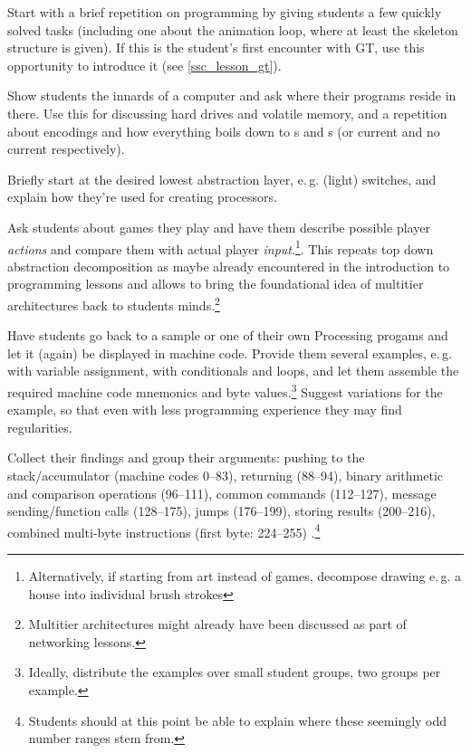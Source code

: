 \begin{instructions}
\item Start with a brief repetition on programming by giving students a few quickly solved tasks (including one about the animation loop, where at least the skeleton structure is given). If this is the student's first encounter with \ac{GT}, use this opportunity to introduce it (see \ref{ssc_lesson_gt}).
\item Show students the innards of a computer and ask where their programs reside in there. Use this for discussing hard drives and volatile memory, and a repetition about encodings and how everything boils down to s and s (or current and no current respectively).
\item Briefly start at the desired lowest abstraction layer, e.\,g. (light) switches, and explain how they're used for creating processors.
\item Ask students about games they play and have them describe possible player \emph{actions} and compare them with actual player \emph{input}.\footnote{Alternatively, if starting from art instead of games, decompose drawing e.\,g. a house into individual brush strokes}. This repeats top down abstraction decomposition as maybe already encountered in the introduction to programming lessons and allows to bring the foundational idea of multitier architectures back to students minds.\footnote{Multitier architectures might already have been discussed as part of networking lessons.}
\item Have students go back to a sample or one of their own Processing progams and let it (again) be displayed in machine code. Provide them several examples, e.\,g. with variable assignment, with conditionals and loops, and let them assemble the required machine code mnemonics and byte values.\footnote{Ideally, distribute the examples over small student groups, two groups per example.} Suggest variations for the example, so that even with less programming experience they may find regularities.
\item Collect their findings and group their arguments: pushing to the stack/accumulator (machine codes 0--83), returning (88--94), binary arithmetic and comparison operations (96--111), common commands (112--127), message sending/function calls (128--175), jumps (176--199), storing results (200--216), combined multi-byte instructions (first byte: 224--255) \cite[p.\,12]{Ber14}.\footnote{Students should at this point be able to explain where these seemingly odd number ranges stem from.}

\end{instructions}
